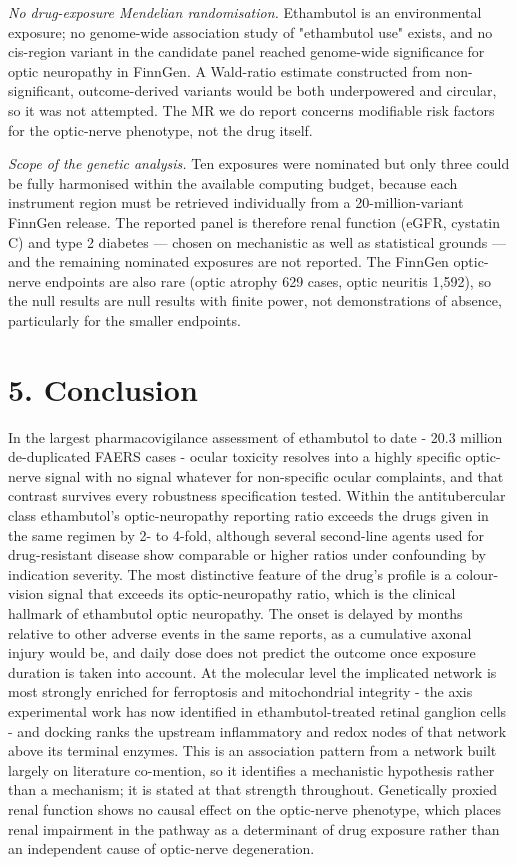 \documentclass[utf8]{FrontiersinVancouver}
\begin{document}
\textit{No drug-exposure Mendelian randomisation.} Ethambutol is an environmental exposure; no genome-wide association study of "ethambutol use" exists, and no cis-region variant in the candidate panel reached genome-wide significance for optic neuropathy in FinnGen. A Wald-ratio estimate constructed from non-significant, outcome-derived variants would be both underpowered and circular, so it was not attempted. The MR we do report concerns modifiable risk factors for the optic-nerve phenotype, not the drug itself.

\textit{Scope of the genetic analysis.} Ten exposures were nominated but only three could be fully harmonised within the available computing budget, because each instrument region must be retrieved individually from a 20-million-variant FinnGen release. The reported panel is therefore renal function (eGFR, cystatin C) and type 2 diabetes --- chosen on mechanistic as well as statistical grounds --- and the remaining nominated exposures are not reported. The FinnGen optic-nerve endpoints are also rare (optic atrophy 629 cases, optic neuritis 1,592), so the null results are null results with finite power, not demonstrations of absence, particularly for the smaller endpoints.

\section{5. Conclusion}

In the largest pharmacovigilance assessment of ethambutol to date - 20.3 million de-duplicated FAERS cases - ocular toxicity resolves into a highly specific optic-nerve signal with no signal whatever for non-specific ocular complaints, and that contrast survives every robustness specification tested. Within the antitubercular class ethambutol's optic-neuropathy reporting ratio exceeds the drugs given in the same regimen by 2- to 4-fold, although several second-line agents used for drug-resistant disease show comparable or higher ratios under confounding by indication severity. The most distinctive feature of the drug's profile is a colour-vision signal that exceeds its optic-neuropathy ratio, which is the clinical hallmark of ethambutol optic neuropathy. The onset is delayed by months relative to other adverse events in the same reports, as a cumulative axonal injury would be, and daily dose does not predict the outcome once exposure duration is taken into account. At the molecular level the implicated network is most strongly enriched for ferroptosis and mitochondrial integrity - the axis experimental work has now identified in ethambutol-treated retinal ganglion cells - and docking ranks the upstream inflammatory and redox nodes of that network above its terminal enzymes. This is an association pattern from a network built largely on literature co-mention, so it identifies a mechanistic hypothesis rather than a mechanism; it is stated at that strength throughout. Genetically proxied renal function shows no causal effect on the optic-nerve phenotype, which places renal impairment in the pathway as a determinant of drug exposure rather than an independent cause of optic-nerve degeneration.
\end{document}
